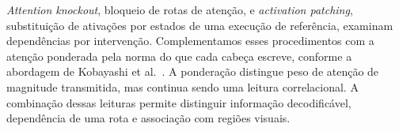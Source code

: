 \textit{Attention knockout}, bloqueio de rotas de atenção, e \textit{activation patching}, substituição de ativações por estados de uma execução de referência, examinam dependências por intervenção. Complementamos esses procedimentos com a atenção ponderada pela norma do que cada cabeça escreve, conforme a abordagem de Kobayashi et al.~\cite{kobayashi}. A ponderação distingue peso de atenção de magnitude transmitida, mas continua sendo uma leitura correlacional. A combinação dessas leituras permite distinguir informação decodificável, dependência de uma rota e associação com regiões visuais.

